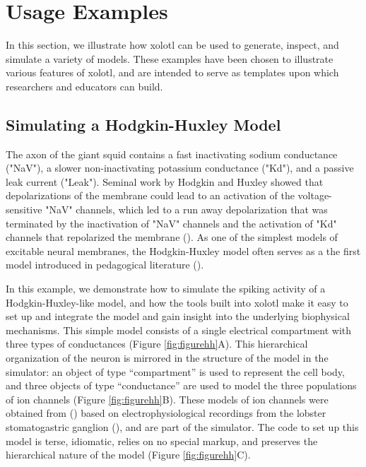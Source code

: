 \documentclass{frontiersSCNS} %
\begin{document}
%
%
%
%
%
%

\section{Usage Examples}
\label{usage}

In this section, we illustrate how xolotl can be used to generate, inspect, and simulate a variety of models. These examples have been chosen to illustrate various features of xolotl, and are intended to serve as templates upon which researchers and educators can build.

%
%
%
%
%
%

\subsection{Simulating a Hodgkin-Huxley Model}

The axon of the giant squid contains a fast inactivating sodium conductance ("NaV"), a slower non-inactivating potassium conductance ("Kd"), and a passive leak current ("Leak"). Seminal work by Hodgkin and Huxley showed that depolarizations of the membrane could lead to an activation of the voltage-sensitive "NaV" channels, which led to a run away depolarization that was terminated by the inactivation of "NaV" channels and the activation of "Kd" channels that repolarized the membrane (\cite{hodgkinComponentsMembraneConductance1952, hodgkinMeasurementCurrentvoltageRelations1952}). As one of the simplest models of excitable neural membranes, the Hodgkin-Huxley model often serves as a the first model introduced in pedagogical literature (\cite{dayanTheoreticalNeuroscience2001, sterrattPrinciplesComputationalModelling2011, trappenbergFundamentalsComputationalNeuroscience2010}).


In this example, we demonstrate how to simulate the spiking activity of a Hodgkin-Huxley-like model, and how the tools built into xolotl make it easy to set up and integrate the model and gain insight into the underlying biophysical mechanisms. This simple model consists of a single electrical compartment with three types of conductances (Figure \ref{fig:figurehh}A). This hierarchical organization of the neuron is mirrored in the structure of the model in the simulator: an object of type ``compartment'' is used to represent the cell body, and three objects of type ``conductance'' are used to model the three populations of ion channels (Figure \ref{fig:figurehh}B). These models of ion channels were obtained from (\cite{liuModelNeuronActivityDependent1998}) based on electrophysiological recordings from the lobster stomatogastric ganglion (\cite{turrigianoSelectiveRegulationCurrent1995}), and are part of the simulator. The code to set up this model is terse, idiomatic, relies on no special markup, and preserves the hierarchical nature of the model (Figure \ref{fig:figurehh}C).
\end{document}
